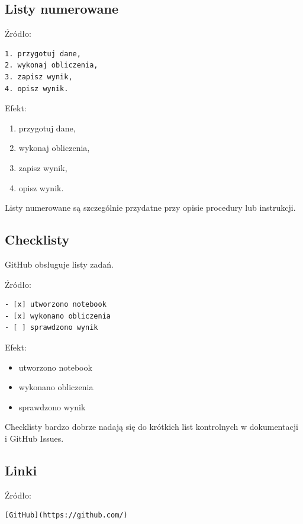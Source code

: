 \documentclass[12pt,a4paper]{article}
\begin{document}
\subsection{Listy numerowane}

Źródło:

\begin{lstlisting}
1. przygotuj dane,
2. wykonaj obliczenia,
3. zapisz wynik,
4. opisz wynik.
\end{lstlisting}

Efekt:

\begin{enumerate}
    \item przygotuj dane,
    \item wykonaj obliczenia,
    \item zapisz wynik,
    \item opisz wynik.
\end{enumerate}

Listy numerowane są szczególnie przydatne przy opisie procedury lub instrukcji.

\subsection{Checklisty}

GitHub obsługuje listy zadań.

Źródło:

\begin{lstlisting}
- [x] utworzono notebook
- [x] wykonano obliczenia
- [ ] sprawdzono wynik
\end{lstlisting}

Efekt:

\begin{itemize}[label=$\square$]
    \item[\checkmark] utworzono notebook
    \item[\checkmark] wykonano obliczenia
    \item sprawdzono wynik
\end{itemize}

Checklisty bardzo dobrze nadają się do krótkich list kontrolnych w dokumentacji i GitHub Issues.

\subsection{Linki}

Źródło:

\begin{lstlisting}
[GitHub](https://github.com/)
\end{lstlisting}
\end{document}
